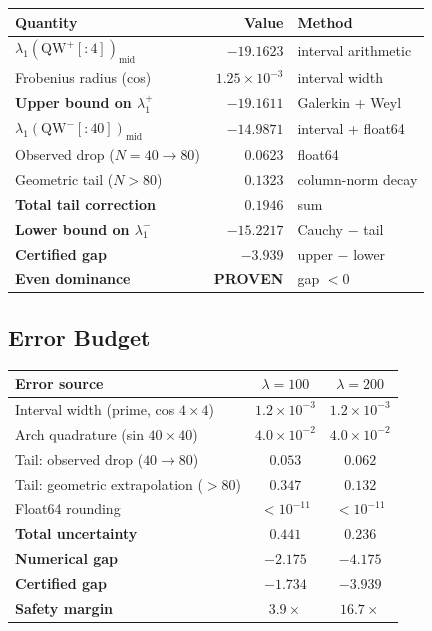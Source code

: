 \documentclass[12pt,a4paper]{article}
\theoremstyle{definition}
\theoremstyle{remark}
\begin{document}
\begin{center}
\renewcommand{\arraystretch}{1.2}
\begin{tabular}{lrl}
\toprule
\textbf{Quantity} & \textbf{Value} & \textbf{Method} \\
\midrule
$\lambda_1(\mathrm{QW}^+[{:}4])_{\mathrm{mid}}$ & $-19.1623$ & interval arithmetic \\
Frobenius radius (cos) & $1.25 \times 10^{-3}$ & interval width \\
\textbf{Upper bound on $\lambda_1^+$} & $\mathbf{-19.1611}$ & Galerkin + Weyl \\
\midrule
$\lambda_1(\mathrm{QW}^-[{:}40])_{\mathrm{mid}}$ & $-14.9871$ & interval + float64 \\
Observed drop ($N{=}40 \to 80$) & $0.0623$ & float64 \\
Geometric tail ($N{>}80$) & $0.1323$ & column-norm decay \\
\textbf{Total tail correction} & $\mathbf{0.1946}$ & sum \\
\textbf{Lower bound on $\lambda_1^-$} & $\mathbf{-15.2217}$ & Cauchy $-$ tail \\
\midrule
\textbf{Certified gap} & $\mathbf{-3.939}$ & upper $-$ lower \\
\textbf{Even dominance} & \textbf{PROVEN} & gap $< 0$ \\
\bottomrule
\end{tabular}
\end{center}

\subsection{Error Budget}

\begin{center}
\renewcommand{\arraystretch}{1.2}
\begin{tabular}{lcc}
\toprule
\textbf{Error source} & $\lambda = 100$ & $\lambda = 200$ \\
\midrule
Interval width (prime, cos $4{\times}4$) & $1.2 \times 10^{-3}$ & $1.2 \times 10^{-3}$ \\
Arch quadrature (sin $40{\times}40$) & $4.0 \times 10^{-2}$ & $4.0 \times 10^{-2}$ \\
Tail: observed drop ($40 \to 80$) & $0.053$ & $0.062$ \\
Tail: geometric extrapolation ($>80$) & $0.347$ & $0.132$ \\
Float64 rounding & $< 10^{-11}$ & $< 10^{-11}$ \\
\midrule
\textbf{Total uncertainty} & $0.441$ & $0.236$ \\
\textbf{Numerical gap} & $-2.175$ & $-4.175$ \\
\textbf{Certified gap} & $-1.734$ & $-3.939$ \\
\textbf{Safety margin} & $3.9\times$ & $16.7\times$ \\
\bottomrule
\end{tabular}
\end{center}
\end{document}
